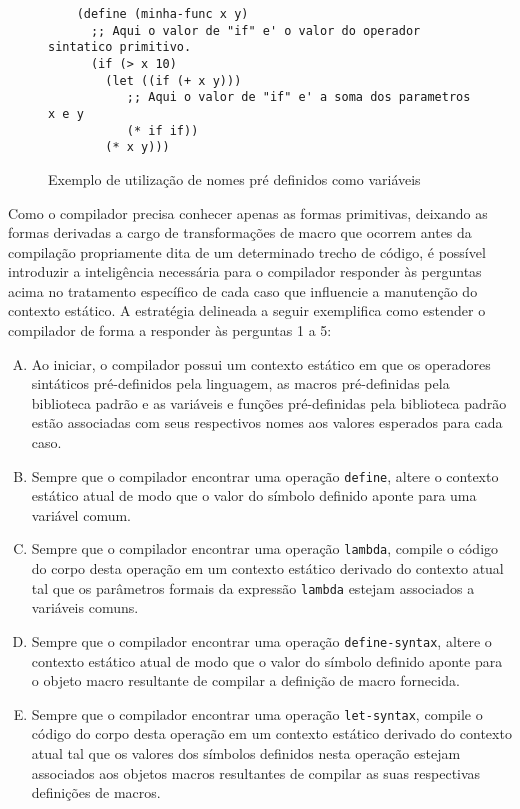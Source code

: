 \begin{figure}[h!]
\begin{lstlisting}
    (define (minha-func x y)
      ;; Aqui o valor de "if" e' o valor do operador sintatico primitivo.
      (if (> x 10)
        (let ((if (+ x y)))
           ;; Aqui o valor de "if" e' a soma dos parametros x e y
           (* if if))
        (* x y)))
\end{lstlisting}
\caption{Exemplo de utilização de nomes pré definidos como variáveis}
\label{lst:compiler-scope}
\end{figure}


Como o compilador precisa conhecer apenas as formas primitivas, deixando as
formas derivadas a cargo de transformações de macro que ocorrem antes da
compilação propriamente dita de um determinado trecho de código, é possível
introduzir a inteligência necessária para o compilador responder às perguntas
acima no tratamento específico de cada caso que influencie a manutenção do
contexto estático. A estratégia delineada a seguir exemplifica como estender o
compilador de forma a responder às perguntas 1 a 5:


\begin{enumerate}[(A)]

\item Ao iniciar, o compilador possui um contexto estático em que os operadores
sintáticos pré-definidos pela linguagem, as macros pré-definidas pela
biblioteca padrão e as variáveis e funções pré-definidas pela biblioteca padrão
estão associadas com seus respectivos nomes aos valores esperados para cada
caso.

\item Sempre que o compilador encontrar uma operação \texttt{define}, altere o contexto
estático atual de modo que o valor do símbolo definido aponte para uma variável
comum.

\item Sempre que o compilador encontrar uma operação \texttt{lambda}, compile o código
do corpo desta operação em um contexto estático derivado do contexto atual tal
que os parâmetros formais da expressão \texttt{lambda} estejam associados a variáveis
comuns.

\item Sempre que o compilador encontrar uma operação \texttt{define-syntax}, altere o
contexto estático atual de modo que o valor do símbolo definido aponte para o
objeto macro resultante de compilar a definição de macro fornecida.

\item Sempre que o compilador encontrar uma operação \texttt{let-syntax}, compile o
código do corpo desta operação em um contexto estático derivado do contexto
atual tal que os valores dos símbolos definidos nesta operação estejam
associados aos objetos macros resultantes de compilar as suas respectivas
definições de macros.

\end{enumerate}

